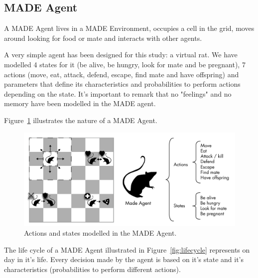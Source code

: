 \documentclass[runningheads]{llncs}
\begin{document}


\subsection{MADE Agent}
A MADE Agent lives in a MADE Environment, occupies a cell in the grid, moves around looking for food or mate and interacts with other agents.

A very simple agent has been designed for this study: a virtual rat. We have modelled 4 states for it (be alive, be hungry, look for mate and be pregnant), 7 actions (move, eat, attack, defend, escape, find mate and have offspring) and parameters that define its characteristics and probabilities to perform actions depending on the state. It's important to remark that no "feelings" and no memory have been modelled in the MADE agent.

Figure~\ref{fig:madeAgent} illustrates the nature of a MADE Agent.

\begin{figure}
\begin{center}
\includegraphics[scale=0.65]{img/MadeAgent.pdf}
\caption{Actions and states modelled in the MADE Agent.}
\label{fig:madeAgent}
\end{center}
\end{figure}

The life cycle of a MADE Agent illustrated in Figure~\ref{fig:lifecycle} represents on day in it's life. Every decision made by the agent is based on it's state and it's characteristics (probabilities to perform different actions).
\end{document}
